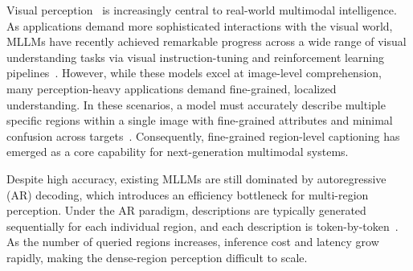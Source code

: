 
    

Visual perception~\citep{lin2014microsoft} is increasingly central to real-world multimodal intelligence. 
%
As applications demand more sophisticated interactions with the visual world, MLLMs have recently achieved remarkable progress across a wide range of visual understanding tasks via visual instruction-tuning and reinforcement learning pipelines~\citep{liu2023visual, li2025llava, an2025llava, bai2025qwen3, wang2025ross3d, zhu2025internvl3, lei2025scalability, meng2025open}.
%
However, while these models excel at image-level comprehension, many perception-heavy applications demand fine-grained, localized understanding. 
%
In these scenarios, a model must accurately describe multiple specific regions within a single image with fine-grained attributes and minimal confusion across targets~\citep{rasheed2024glamm, lian2025describe, wang2025grasp}. 
%
Consequently, fine-grained region-level captioning has emerged as a core capability for next-generation multimodal systems.

Despite high accuracy, existing MLLMs are still dominated by autoregressive (AR) decoding, which introduces an efficiency bottleneck for multi-region perception. 
%
Under the AR paradigm, descriptions are typically generated sequentially for each individual region, and each description is token-by-token~\citep{lian2025describe, wang2025grasp}. 
%
As the number of queried regions increases, inference cost and latency grow rapidly, making the dense-region perception difficult to scale.

